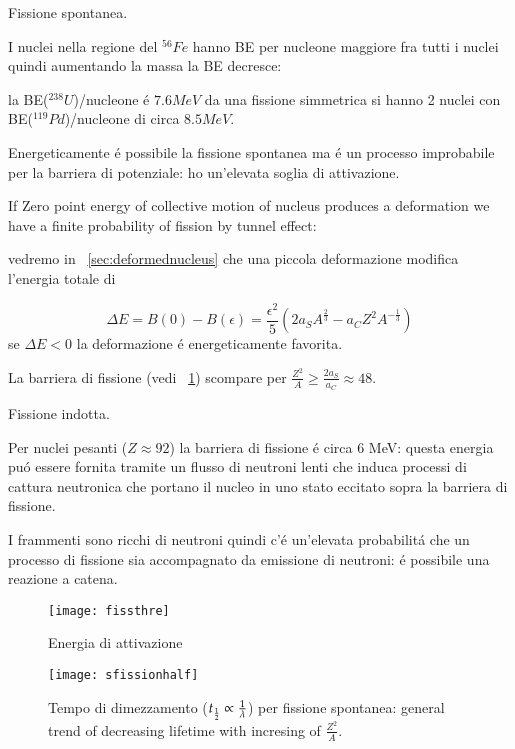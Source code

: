 \begin{itemize*}
\item Fissione spontanea.

I nuclei nella regione del $^{56}Fe$ hanno BE per nucleone maggiore fra tutti i nuclei quindi aumentando la massa la BE decresce: 

la BE($^{238}U$)/nucleone \'e $7.6 MeV$ da una fissione simmetrica si hanno 2 nuclei con BE($^{119}Pd$)/nucleone di circa $8.5 MeV$.

Energeticamente \'e possibile la fissione spontanea ma \'e un processo improbabile per la barriera di potenziale: ho un'elevata soglia di attivazione.


If Zero point energy of collective motion of nucleus produces a deformation we have a finite probability of fission by tunnel effect: 

vedremo in ~\ref{sec:deformednucleus} che una piccola deformazione modifica l'energia totale di

\begin{equation*}
\Delta E=B(0)-B(\epsilon)=\frac{\epsilon^2}{5}(2a_SA^{\frac{2}{3}}-a_CZ^2A^{-\frac{1}{3}})
\end{equation*}
se $\Delta E<0$ la deformazione \'e energeticamente favorita.

La barriera di fissione (vedi ~\ref{fig:fissionthreshold}) scompare  per $\frac{Z^2}{A}\geq\frac{2a_S}{a_C}\approx48$.

\item Fissione indotta.

Per nuclei pesanti ($Z\approx92$) la barriera di fissione \'e circa 6 MeV: questa energia pu\'o essere fornita tramite un flusso di neutroni lenti che induca processi di cattura neutronica che portano il nucleo in uno stato eccitato sopra la barriera di fissione.

I frammenti sono ricchi di neutroni quindi c'\'e un'elevata probabilit\'a che un processo di fissione sia accompagnato da emissione di neutroni: \'e possibile una reazione a catena.

\end{itemize*}

\begin{figure}[!ht]
\centering
\texttt{[image: fissthre]}
\caption{Energia di attivazione}
\label{fig:fissionthreshold}
\end{figure}


\begin{figure}[!ht]
\centering
\texttt{[image: sfissionhalf]}
\caption{Tempo di dimezzamento ($t_{\frac{1}{2}}\propto\frac{1}{\lambda}$) per fissione spontanea: general trend of decreasing lifetime with incresing of $\frac{Z^2}{A}$.}
\end{figure}


